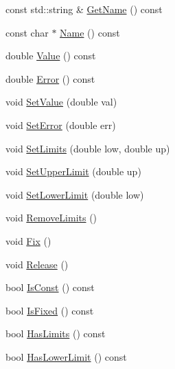 \begin{DoxyCompactItemize}
\item 
const std\+::string \& \mbox{\hyperlink{classROOT_1_1Minuit2_1_1MinuitParameter_adc67abcb32783aed362068ee38cb24b7}{Get\+Name}} () const
\item 
const char $\ast$ \mbox{\hyperlink{classROOT_1_1Minuit2_1_1MinuitParameter_a151958b5dbcc194a090753e0b2605fbc}{Name}} () const
\item 
double \mbox{\hyperlink{classROOT_1_1Minuit2_1_1MinuitParameter_ac77aed82006ba9e9598df49a1753d31c}{Value}} () const
\item 
double \mbox{\hyperlink{classROOT_1_1Minuit2_1_1MinuitParameter_af92997a2e9a7209fbddd286bbd1dbc3d}{Error}} () const
\item 
void \mbox{\hyperlink{classROOT_1_1Minuit2_1_1MinuitParameter_a535d59656c70ba8a0cc0ff196bac2d93}{Set\+Value}} (double val)
\item 
void \mbox{\hyperlink{classROOT_1_1Minuit2_1_1MinuitParameter_affa3dbe5755e6345181b98d168722a60}{Set\+Error}} (double err)
\item 
void \mbox{\hyperlink{classROOT_1_1Minuit2_1_1MinuitParameter_aeb1a61d3c007780ec388e11dd39274fc}{Set\+Limits}} (double low, double up)
\item 
void \mbox{\hyperlink{classROOT_1_1Minuit2_1_1MinuitParameter_a9e0c6225558635b19b5d10d0c6d9bb86}{Set\+Upper\+Limit}} (double up)
\item 
void \mbox{\hyperlink{classROOT_1_1Minuit2_1_1MinuitParameter_abf4e64af27e615b90fff7a21e2831488}{Set\+Lower\+Limit}} (double low)
\item 
void \mbox{\hyperlink{classROOT_1_1Minuit2_1_1MinuitParameter_a8c120aa76754c8c8209d0a8c78605137}{Remove\+Limits}} ()
\item 
void \mbox{\hyperlink{classROOT_1_1Minuit2_1_1MinuitParameter_ad0857ffbf012d785401c111cacc79085}{Fix}} ()
\item 
void \mbox{\hyperlink{classROOT_1_1Minuit2_1_1MinuitParameter_a9bf4bb232de53b61fc264c62b44d0b27}{Release}} ()
\item 
bool \mbox{\hyperlink{classROOT_1_1Minuit2_1_1MinuitParameter_afa82fc56a19c43531f469efc1fa34c2c}{Is\+Const}} () const
\item 
bool \mbox{\hyperlink{classROOT_1_1Minuit2_1_1MinuitParameter_a2d7f48ed0d6d1ac124e390e54df4de32}{Is\+Fixed}} () const
\item 
bool \mbox{\hyperlink{classROOT_1_1Minuit2_1_1MinuitParameter_a6319fe000027da162c4adad8782ef27b}{Has\+Limits}} () const
\item 
bool \mbox{\hyperlink{classROOT_1_1Minuit2_1_1MinuitParameter_a61b9c27aff1b1d7bf85bed898dd50dda}{Has\+Lower\+Limit}} () const

\end{DoxyCompactItemize}
